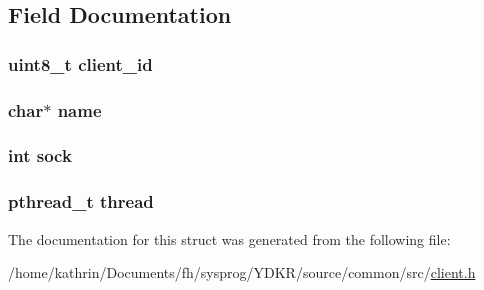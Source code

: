 \subsection{Field Documentation}
\hypertarget{structclient__info_af230372c601d9c597265265e9f83f017}{
\subsubsection[{client\_\-id}]{\setlength{\rightskip}{0pt plus 5cm}uint8\_\-t {\bf client\_\-id}}}
\label{structclient__info_af230372c601d9c597265265e9f83f017}
\hypertarget{structclient__info_a5ac083a645d964373f022d03df4849c8}{
\subsubsection[{name}]{\setlength{\rightskip}{0pt plus 5cm}char$\ast$ {\bf name}}}
\label{structclient__info_a5ac083a645d964373f022d03df4849c8}
\hypertarget{structclient__info_a5903d0b282fc5eae503de618f896b5e1}{
\subsubsection[{sock}]{\setlength{\rightskip}{0pt plus 5cm}int {\bf sock}}}
\label{structclient__info_a5903d0b282fc5eae503de618f896b5e1}
\hypertarget{structclient__info_a01f75a9ad916f63a94e06a27635ba278}{
\subsubsection[{thread}]{\setlength{\rightskip}{0pt plus 5cm}pthread\_\-t {\bf thread}}}
\label{structclient__info_a01f75a9ad916f63a94e06a27635ba278}


The documentation for this struct was generated from the following file:\begin{DoxyCompactItemize}
\item 
/home/kathrin/Documents/fh/sysprog/YDKR/source/common/src/\hyperlink{common_2src_2client_8h}{client.h}\end{DoxyCompactItemize}
